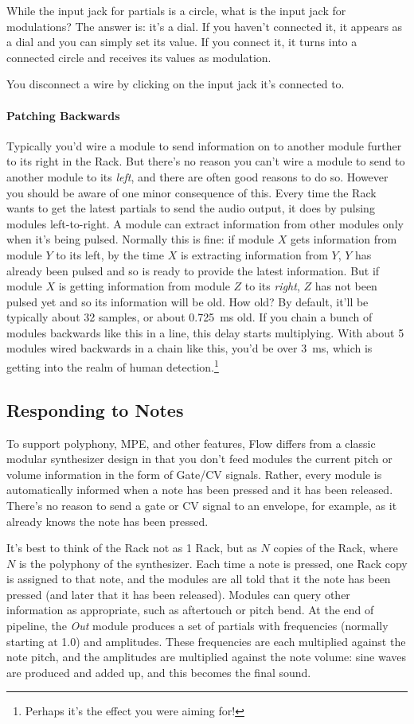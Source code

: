 \documentclass{article}
\newcommand\name{Flow}
\begin{document}
While the input jack for partials is a circle, what is the input jack for modulations?  The answer is: it's a dial.  If you haven't connected it, it appears as a dial and you can simply set its value.  If you connect it, it turns into a connected circle and receives its values as modulation. 

You disconnect a wire by clicking on the input jack it's connected to.

\paragraph{Patching Backwards}  Typically you'd wire a module to send information on to another module further to its right in the Rack.  But there's no reason you can't wire a module to send to another module to its {\it left}, and there are often good reasons to do so.  However you should be aware of one minor consequence of this.  Every time the Rack wants to get the latest partials to send the audio output, it does by pulsing modules left-to-right.  A module can extract information from other modules only when it's being pulsed.  Normally this is fine: if module \(X\) gets information from module \(Y\) to its left, by the time \(X\) is extracting information from \(Y\), \(Y\) has already been pulsed and so is ready to provide the latest information.  But if module \(X\) is getting information from module \(Z\) to its {\it right}, \(Z\) has not been pulsed yet and so its information will be old.  How old?  By default, it'll be typically about 32 samples, or about 0.725~ms old.  If you chain a bunch of modules backwards like this in a line, this delay starts multiplying.   With about 5 modules wired backwards in a chain like this, you'd be over 3~ms, which is getting into the realm of human detection.\footnote{Perhaps it's the effect you were aiming for!} 

\subsection{Responding to Notes} To support polyphony, MPE, and other features, {\name} differs from a classic modular synthesizer design in that you don't feed modules the current pitch or volume information in the form of Gate/CV signals. Rather, every module is automatically informed when a note has been pressed and it has been released.  There's no reason to send a gate or CV signal to an envelope, for example, as it already knows the note has been pressed.

It's best to think of the Rack not as 1 Rack, but as \(N\) copies of the Rack, where \(N\) is the polyphony of the synthesizer.  Each time a note is pressed, one Rack copy is assigned to that note, and the modules are all told that it the note has been pressed (and later that it has been released).  Modules can query other information as appropriate, such as aftertouch or pitch bend.  At the end of pipeline, the {\it Out} module produces a set of partials with frequencies (normally starting at 1.0) and amplitudes.  These frequencies are each multiplied against the note pitch, and the amplitudes are multiplied against the note volume: sine waves are produced and added up, and this becomes the final sound.
\end{document}
